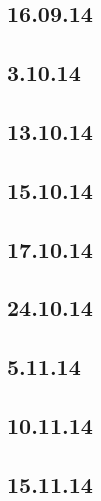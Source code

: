 \documentclass[11pt]{article}
\begin{document}
	\subsection{16.09.14}
	
	
	\subsection{3.10.14}
	
	
	\subsection{13.10.14}
	
	
	\subsection{15.10.14}
	
	
	\subsection{17.10.14}
	

	\subsection{24.10.14}
		
	
	\subsection{5.11.14}
		

	\subsection{10.11.14}
	
	
	\subsection{15.11.14}
	
	
	
\end{document}
